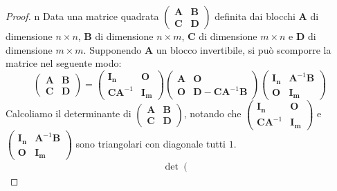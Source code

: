 \begin{proof}{n}
	Data una matrice quadrata $\left(
	\begin{array}{c|c}
		\mathbf{A} & \mathbf{B}\\
		\hline
		\mathbf{C} & \mathbf{D}
	\end{array}
	\right)$
	definita dai blocchi $\mathbf{A}$ di dimensione $n\times n$, $\mathbf{B}$ di dimensione $n\times m$, $\mathbf{C}$ di dimensione $m\times n$ e $\mathbf{D}$ di dimensione $m\times m$. Supponendo $\mathbf{A}$ un blocco invertibile, si può scomporre la matrice nel seguente modo:
	\begin{equation*}
		\left(
		\begin{array}{c|c}
			\mathbf{A} & \mathbf{B}\\
			\hline
			\mathbf{C} & \mathbf{D}
		\end{array}
		\right)=\left(
		\begin{array}{c|c}
			\mathbf{I_n} & \mathbf{O}\\
			\hline
			\mathbf{CA}^{-1} & \mathbf{I_m}
		\end{array}
		\right)\left(
		\begin{array}{c|c}
			\mathbf{A} & \mathbf{O}\\
			\hline
			\mathbf{O} & \mathbf{D-CA}^{-1}\mathbf{B}
		\end{array}
		\right)
		\left(
		\begin{array}{c|c}
			\mathbf{I_n} & \mathbf{A}^{-1}\mathbf{B}\\
			\hline
			\mathbf{O} & \mathbf{I_m}
		\end{array}
		\right)
	\end{equation*}
	Calcoliamo il determinante di $\left(
	\begin{array}{c|c}
		\mathbf{A} & \mathbf{B}\\
		\hline
		\mathbf{C} & \mathbf{D}
	\end{array}
	\right)$, notando che $\left(
	\begin{array}{c|c}
		\mathbf{I_n} & \mathbf{O}\\
		\hline
		\mathbf{CA}^{-1} & \mathbf{I_m}
	\end{array}
	\right)$ e $\left(
	\begin{array}{c|c}
		\mathbf{I_n} & \mathbf{A}^{-1}\mathbf{B}\\
		\hline
		\mathbf{O} & \mathbf{I_m}
	\end{array}
	\right)$ sono triangolari con diagonale tutti $1$.
	\begin{align*}
		\det\left(\begin{array}{c|c}

\end{array}
\end{align*}
\end{proof}
